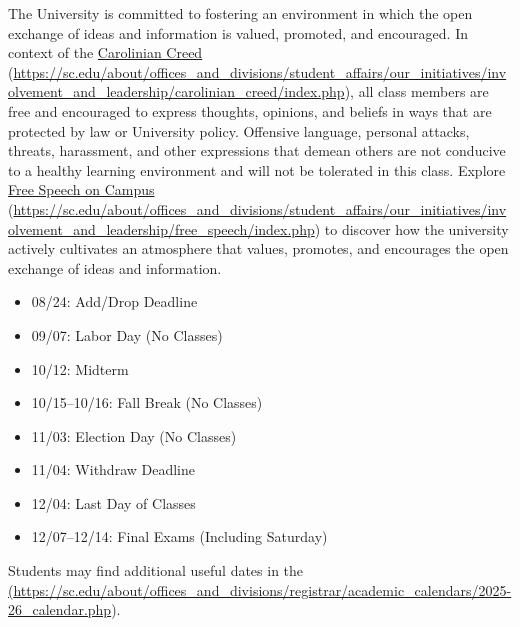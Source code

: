 \documentclass[11pt,letterpaper]{article}
\begin{document}

The University is committed to fostering an environment in which the open exchange of ideas and information is valued, promoted, and encouraged.  In context of the \href{https://sc.edu/about/offices\_and\_divisions/student\_affairs/our\_initiatives/involvement\_and\_leadership/carolinian\_creed/index.php}{Carolinian Creed} (\url{https://sc.edu/about/offices\_and\_divisions/student\_affairs/our\_initiatives/involvement\_and\_leadership/carolinian\_creed/index.php}), all class members are free and encouraged to express thoughts, opinions, and beliefs in ways that are protected by law or University policy. Offensive language, personal attacks, threats, harassment, and other expressions that demean others are not conducive to a healthy learning environment and will not be tolerated in this class. Explore \href{https://sc.edu/about/offices\_and\_divisions/student\_affairs/our\_initiatives/involvement\_and\_leadership/free\_speech/index.php}{Free Speech on Campus} (\url{https://sc.edu/about/offices\_and\_divisions/student\_affairs/our\_initiatives/involvement\_and\_leadership/free\_speech/index.php}) to discover how the university actively cultivates an atmosphere that values, promotes, and encourages the open exchange of ideas and information. \par\vspace{0.4cm}




	\begin{itemize}
	\item 08/24: Add/Drop Deadline
	\item 09/07: Labor Day (No Classes)
	\item 10/12: Midterm
	\item 10/15--10/16: Fall Break (No Classes)
	\item 11/03: Election Day (No Classes)
	\item 11/04: Withdraw Deadline
	\item 12/04: Last Day of Classes
	\item 12/07--12/14: Final Exams (Including Saturday)
	\end{itemize}

Students may find additional useful dates in the \href{https://sc.edu/about/offices\_and\_divisions/registrar/academic\_calendars/2025-26\_calendar.php} (\url{https://sc.edu/about/offices\_and\_divisions/registrar/academic\_calendars/2025-26\_calendar.php}). 
\sectionbreak
\end{document}
